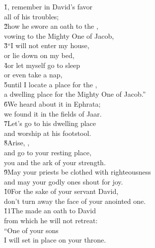\begin{poetry}
\poeml \v{1}, remember in David's favor \\
\poemll    all of his troubles; \\
\poeml \v{2}how he swore an oath to the , \\
\poemll    vowing to the Mighty One of Jacob, \\
\poeml \v{3}``I will not enter my house, \\
\poemll    or lie down on my bed, \\
\poeml \v{4}or let myself go to sleep \\
\poemll    or even take a nap, \\
\poeml \v{5}until I locate a place for the , \\
\poemll    a dwelling place for the Mighty One of Jacob.'' \\
\poeml \v{6}We heard about it in Ephrata; \\
\poemll    we found it in the fields of Jaar. \\
\poeml \v{7}Let's go to his dwelling place \\
\poemll    and worship at his footstool. \\
\poeml \v{8}Arise, , \\
\poemll    and go to your resting place, \\
\poemlll       you and the ark of your strength. \\
\poeml \v{9}May your priests be clothed with righteousness \\
\poemll    and may your godly ones shout for joy. \\
\poeml \v{10}For the sake of your servant David, \\
\poemll    don't turn away the face of your anointed one. \\
\poeml \v{11}The  made an oath to David \\
\poemll    from which he will not retreat: \\
\poeml ``One of your sons \\
\poemll    I will set in place on your throne. \\

\end{poetry}

